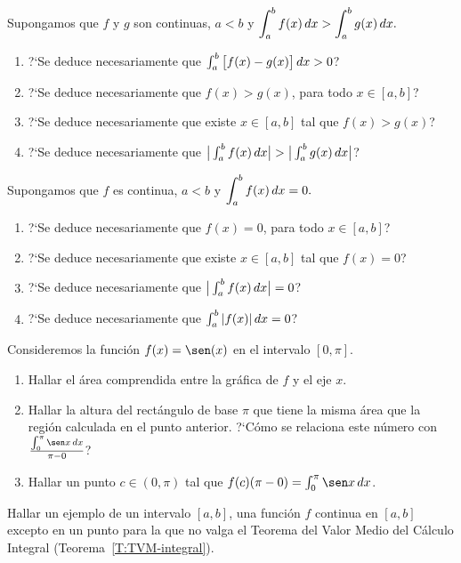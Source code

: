 \item Supongamos que $f$ y $g$ son continuas, $a<b$ y 
$\displaystyle
\int_a^b f(x)\,dx > \int_a^b g(x)\,dx.
$
\begin{enumerate}
  \item ?`Se deduce necesariamente que $\int_a^b \big[ f(x)-g(x)\big]\,dx > 0$?
  \item ?`Se deduce necesariamente que $f(x)>g(x)$, para todo $x\in [a,b]$?
  \item ?`Se deduce necesariamente que existe $x\in[a,b]$ tal que $f(x)>g(x)$?
  \item ?`Se deduce necesariamente que $\big|\int_a^b f(x)\,dx\big| > \big|\int_a^b g(x)\,dx\big| $?
\end{enumerate}

\item Supongamos que $f$ es continua, $a<b$ y 
$\displaystyle
\int_a^b f(x)\,dx =0.
$
\begin{enumerate}
  \item ?`Se deduce necesariamente que $f(x)=0$, para todo $x\in [a,b]$?
  \item ?`Se deduce necesariamente que existe $x\in[a,b]$ tal que $f(x)=0$?
  \item ?`Se deduce necesariamente que $\big|\int_a^b f(x)\,dx\big| =0 $?
  \item ?`Se deduce necesariamente que $\int_a^b |f(x)|\,dx =0 $?
\end{enumerate}

\item Consideremos la función $f(x)=\sen(x)$ en el intervalo $[0,\pi]$.
\begin{enumerate}
  \item Hallar el área comprendida entre la gráfica de $f$ y el eje $x$.
  \item Hallar la altura del rectángulo de base $\pi$ que tiene la misma área que la región calculada en el punto anterior. ?`Cómo se relaciona este número con $\frac{\int_0^\pi \sen x\dx}{\pi-0}$?
  \item Hallar un punto $c\in(0,\pi)$ tal que $f(c)(\pi-0)= \int_0^\pi \sen x\dx$.
\end{enumerate}

\item Hallar un ejemplo de un intervalo $[a,b]$, una función $f$ continua en $[a,b]$ excepto en un punto para la que no valga el Teorema del Valor Medio del Cálculo Integral (Teorema~\ref{T:TVM-integral}).